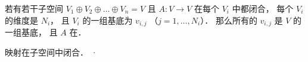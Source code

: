 
\begin{issues}
\issueDraft
\end{issues}


若有若干子空间 $V_1 \oplus V_2 \oplus \dots \oplus V_n = V$ 且 $A: V\to V$ 在每个 $V_i$ 中都闭合， 每个 $V_i$ 的维度是 $N_i$， 且 $V_i$ 的一组基底为 $v_{i,j}$ （$j=1,\dots,N_i$）． 那么所有的 $v_{i,j}$ 是 $V$ 的一组基底， 且 $A$ 在．

映射在子空间中闭合． 
·